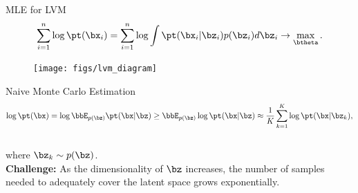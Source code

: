 \documentclass{beamer}
\begin{document}
\begin{frame}{MLE for LVM}
	\[
		\sum_{i=1}^n \log \pt(\bx_i) = \sum_{i=1}^n \log \int \pt(\bx_i| \bz_i) p(\bz_i) d\bz_i \rightarrow \max_{\btheta}.
	\]
    \eqpause
	\vspace{-0.6cm}
	\begin{figure}
		\texttt{[image: figs/lvm\_diagram]}
	\end{figure}
    \eqpause
	\vspace{-0.5cm}
	\begin{block}{Naive Monte Carlo Estimation}
		\vspace{-0.7cm}
		\[
			\log \pt(\bx) = \log \bbE_{p(\bz)} \pt(\bx | \bz) \geq \bbE_{p(\bz)} \log \pt(\bx | \bz) \approx \frac{1}{K} \sum_{k=1}^{K} \log \pt(\bx | \bz_k),
		\]
		\vspace{-0.7cm} \\
		where $\bz_k \sim p(\bz)$. \\
        \eqpause
		\textbf{Challenge:} As the dimensionality of $\bz$ increases, the number of samples needed to adequately cover the latent space grows exponentially.
	\end{block}
\end{frame}
\end{document}
